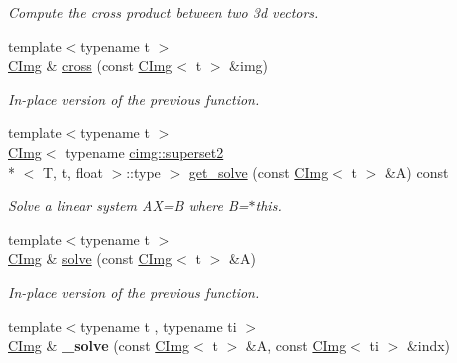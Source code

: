 \begin{DoxyCompactItemize}
\begin{DoxyCompactList}\small\item\em Compute the cross product between two 3d vectors. \end{DoxyCompactList}\item 
\hypertarget{structcimg__library_1_1_c_img_a2483b68d0f8e28e165cb4a6154810fb7}{{\footnotesize template$<$typename t $>$ }\\\hyperlink{structcimg__library_1_1_c_img}{C\-Img} \& \hyperlink{structcimg__library_1_1_c_img_a2483b68d0f8e28e165cb4a6154810fb7}{cross} (const \hyperlink{structcimg__library_1_1_c_img}{C\-Img}$<$ t $>$ \&img)}\label{structcimg__library_1_1_c_img_a2483b68d0f8e28e165cb4a6154810fb7}

\begin{DoxyCompactList}\small\item\em In-\/place version of the previous function. \end{DoxyCompactList}\item 
\hypertarget{structcimg__library_1_1_c_img_a8e1066b7901486897438a4f045e5deec}{{\footnotesize template$<$typename t $>$ }\\\hyperlink{structcimg__library_1_1_c_img}{C\-Img}$<$ typename \hyperlink{structcimg__library_1_1cimg_1_1superset2}{cimg\-::superset2}\\*
$<$ T, t, float $>$\-::type $>$ \hyperlink{structcimg__library_1_1_c_img_a8e1066b7901486897438a4f045e5deec}{get\-\_\-solve} (const \hyperlink{structcimg__library_1_1_c_img}{C\-Img}$<$ t $>$ \&A) const }\label{structcimg__library_1_1_c_img_a8e1066b7901486897438a4f045e5deec}

\begin{DoxyCompactList}\small\item\em Solve a linear system A\-X=B where B=$\ast$this. \end{DoxyCompactList}\item 
\hypertarget{structcimg__library_1_1_c_img_a40eae09d35344fccbc2731042404b62a}{{\footnotesize template$<$typename t $>$ }\\\hyperlink{structcimg__library_1_1_c_img}{C\-Img} \& \hyperlink{structcimg__library_1_1_c_img_a40eae09d35344fccbc2731042404b62a}{solve} (const \hyperlink{structcimg__library_1_1_c_img}{C\-Img}$<$ t $>$ \&A)}\label{structcimg__library_1_1_c_img_a40eae09d35344fccbc2731042404b62a}

\begin{DoxyCompactList}\small\item\em In-\/place version of the previous function. \end{DoxyCompactList}\item 
\hypertarget{structcimg__library_1_1_c_img_a480d19c18065f66504ff10fdfc077478}{{\footnotesize template$<$typename t , typename ti $>$ }\\\hyperlink{structcimg__library_1_1_c_img}{C\-Img} \& {\bfseries \-\_\-solve} (const \hyperlink{structcimg__library_1_1_c_img}{C\-Img}$<$ t $>$ \&A, const \hyperlink{structcimg__library_1_1_c_img}{C\-Img}$<$ ti $>$ \&indx)}\label{structcimg__library_1_1_c_img_a480d19c18065f66504ff10fdfc077478}


\end{DoxyCompactItemize}
